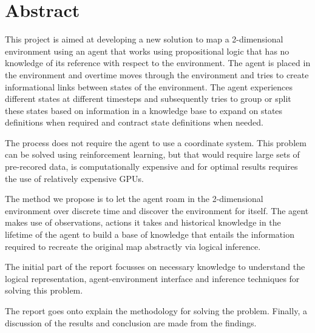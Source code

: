 \chapter{Abstract}

%
%

This project is aimed at developing a new solution to map a 2-dimensional environment using an agent that works using propositional logic that has no knowledge of its reference with respect to the environment. The agent is placed in the environment and overtime moves through the environment and tries to create informational links between states of the environment. The agent experiences different states at different timesteps and subsequently tries to group or split these states based on information in a knowledge base to expand on states definitions when required and contract state definitions when needed.

The process does not require the agent to use a coordinate system. This problem can be solved using reinforcement learning, but that would require large sets of pre-recored data, is computationally expensive and for optimal results requires the use of relatively expensive GPUs.

The method we propose is to let the agent roam in the 2-dimensional environment over discrete time and discover the environment for itself.
The agent makes use of observations, actions it takes and historical knowledge in the lifetime of the agent to build a base of knowledge that entails the information required to recreate the original map abstractly via logical inference. 

The initial part of the report focusses on necessary knowledge to understand the logical representation, agent-environment interface and inference techniques for solving this problem. 

The report goes onto explain the methodology for solving the problem.
Finally, a discussion of the results and conclusion are made from the findings.

